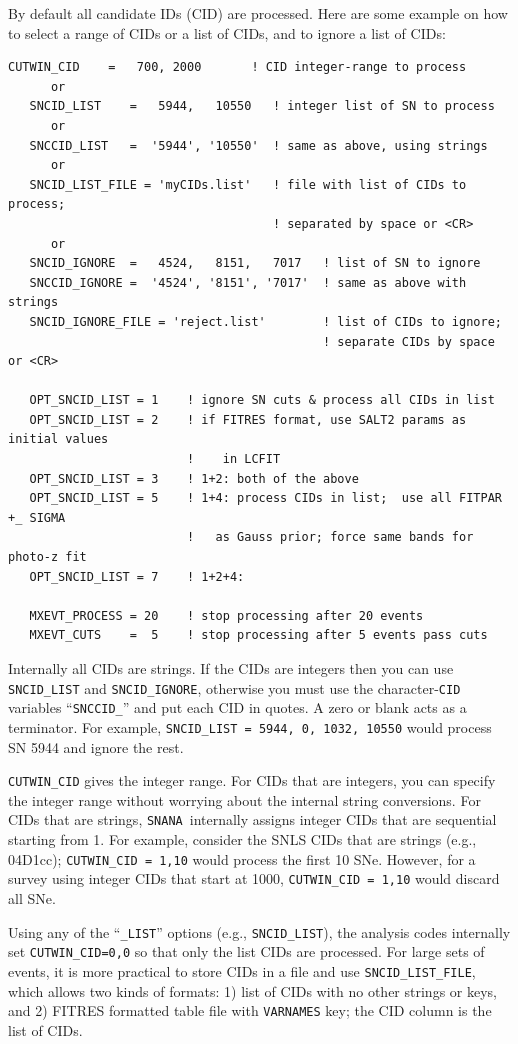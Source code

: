 \documentclass[12pt]{article}
\newcommand{\snana}{{\tt SNANA}}
\begin{document}
By default all candidate IDs (CID) are processed.
Here are some example on how to select a range
of CIDs or a list of CIDs, and to ignore
a list of CIDs:
%
\begin{Verbatim}[frame=single]
   CUTWIN_CID    =   700, 2000       ! CID integer-range to process
      or
   SNCID_LIST    =   5944,   10550   ! integer list of SN to process
      or
   SNCCID_LIST   =  '5944', '10550'  ! same as above, using strings
      or
   SNCID_LIST_FILE = 'myCIDs.list'   ! file with list of CIDs to process;
                                     ! separated by space or <CR>
      or
   SNCID_IGNORE  =   4524,   8151,   7017   ! list of SN to ignore
   SNCCID_IGNORE =  '4524', '8151', '7017'  ! same as above with strings
   SNCID_IGNORE_FILE = 'reject.list'        ! list of CIDs to ignore; 
                                            ! separate CIDs by space or <CR>

   OPT_SNCID_LIST = 1    ! ignore SN cuts & process all CIDs in list 
   OPT_SNCID_LIST = 2    ! if FITRES format, use SALT2 params as initial values
                         !    in LCFIT
   OPT_SNCID_LIST = 3    ! 1+2: both of the above 
   OPT_SNCID_LIST = 5    ! 1+4: process CIDs in list;  use all FITPAR +_ SIGMA
                         !   as Gauss prior; force same bands for photo-z fit
   OPT_SNCID_LIST = 7    ! 1+2+4: 
   
   MXEVT_PROCESS = 20    ! stop processing after 20 events
   MXEVT_CUTS    =  5    ! stop processing after 5 events pass cuts
\end{Verbatim}
%
Internally all CIDs are strings. If the CIDs are integers
then you can use {\tt SNCID\_LIST} and {\tt SNCID\_IGNORE},
otherwise you must use the character-{\tt CID} variables
``{\tt SNCCID\_}''  and put each CID in quotes. 
A zero or blank acts as a terminator. For example, 
{\tt SNCID\_LIST = 5944, 0, 1032, 10550}
would process SN 5944 and ignore the rest.

 
{\tt CUTWIN\_CID} gives the integer range.
For CIDs that are integers, you can specify the integer range
without worrying about the internal string conversions.
For CIDs that are strings, \snana\ internally assigns
integer CIDs that are sequential starting from 1. 
For example, consider the SNLS CIDs that are strings (e.g., 04D1cc);
{\tt CUTWIN\_CID = 1,10} would process the first 10 SNe.
However, for a survey using integer CIDs that start at 1000,
{\tt CUTWIN\_CID = 1,10} would discard all SNe.


Using any of the ``{\tt \_LIST}'' options (e.g., {\tt SNCID\_LIST}),
the analysis codes internally set {\tt CUTWIN\_CID=0,0}
so that only the list CIDs are processed.
For large sets of events, it is more practical to store CIDs
in a file and use {\tt SNCID\_LIST\_FILE}, which allows two
kinds of formats: 1) list of CIDs with no other strings or keys, and
2) FITRES formatted table file with {\tt VARNAMES} key; the CID column
is the list of CIDs.
\end{document}
